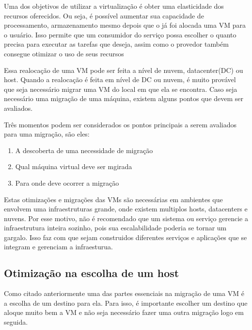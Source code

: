 Uma dos objetivos de utilizar a virtualização é obter uma elasticidade dos recursos oferecidos.
Ou seja, é possível aumentar sua capacidade de processamento, armazenamento mesmo depois que o
já foi alocada uma VM para o usuário. 
Isso permite que um consumidor do  serviço possa escolher o quanto precisa para executar as tarefas que deseja, 
assim como o provedor também consegue otimizar o uso de seus recursos

Essa realocação de uma VM pode ser feita a nível de nuvem, datacenter(DC) ou host. 
Quando a realocação é feita em nível de DC ou nuvem, é muito provável que seja 
necessário migrar uma VM do local em que ela se encontra. 
Caso seja necessário uma migração de uma máquina, existem alguns pontos que devem ser avaliados.

Três momentos podem ser considerados os pontos principais a serem avaliados para uma migração, 
são eles:

\begin{enumerate}
\item A descoberta de uma necessidade de migração
\item Qual máquina virtual deve ser mgirada
\item Para onde deve ocorrer a migração
\end{enumerate}

Estas otimizações e migrações das VMs são necessárias em ambientes que envolvem uma infraestruturas
grande, onde existem multiplos hosts, datacenters e nuvens. Por esse motivo, não é recomendado que 
um sistema ou serviço gerencie a infraestrutura inteira sozinho, pois sua escalabilidade 
poderia se tornar um gargalo. Isso faz com que sejam construidos diferentes serviços e aplicações 
que se integram e gerenciam a infraesturua.

\subsection{Otimização na escolha de um host}
Como citado anteriormente uma das partes essenciais na migração de uma VM é a escolha de um destino para ela.
Para isso, é importante escolher um destino que aloque muito bem a VM e não seja necessário fazer uma outra
migração logo em seguida. 
